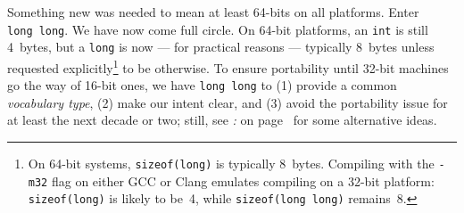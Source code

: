 Something new was needed to mean at least 64-bits on all platforms.
Enter \texttt{long}~\texttt{long}. We have now come full circle. On
64-bit platforms, an \texttt{int} is still 4~bytes, but a \texttt{long}
is now --- for practical reasons --- typically 8~bytes unless requested
explicitly{\cprotect\footnote{On 64-bit systems, \texttt{sizeof(long)}
is typically 8~bytes. Compiling with the \texttt{-m32} flag on either
GCC or Clang emulates compiling on a 32-bit platform:
\texttt{sizeof(long)} is likely to be~4, while
  \texttt{sizeof(long}~\texttt{long)} remains~8.}} to be otherwise. To ensure portability until 32-bit machines go the way of 16-bit ones,
we have \texttt{long}~\texttt{long} to (1) provide a common \emph{vocabulary type}, (2)
make our intent clear, and (3) avoid the portability issue for
at least the next decade or two; still, see {\it{}: } on page~\pageref{relying-on-the-relative-sizes-of-int,-long,-and-long-long} for some alternative ideas.



